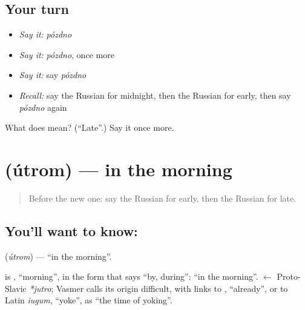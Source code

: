 \subsection*{Your turn}
\begin{itemize}
\raggedright
  \item \emph{Say it:} \emph{pózdno}
  \item \emph{Say it:} \emph{pózdno}, once more
  \item \emph{Say it:} say \emph{pózdno}
  \item \emph{Recall:} say the Russian for midnight, then the Russian for early, then say \emph{pózdno} again
\end{itemize}

\begin{tcolorbox}[breakable,colback=teal!4,colframe=teal!35!black,title={Before you move on}]
What does  mean? (\textquotedblleft{}Late\textquotedblright{}.) Say it once more.
\end{tcolorbox}
\section[\texorpdfstring{\ru{утром} (útrom)}{утром (útrom)}]{ (útrom) — in the morning}

\label{lesson:RU-C83-in-the-morning}



\begin{quote}
Before the new one: say the Russian for early, then the Russian for late.
\end{quote}

\subsection*{You'll want to know: }
\textbf{} (\emph{útrom}) — \textquotedblleft{}in the morning\textquotedblright{}.

\begin{cousinweb}
\textbf{} is \emph{}, \textquotedblleft{}morning\textquotedblright{}, in the form that says \textquotedblleft{}by, during\textquotedblright{}: \textquotedblleft{}in the morning\textquotedblright{}. \emph{} $\leftarrow$ Proto-Slavic \emph{*jutro}; Vasmer calls its origin difficult, with links to \emph{}, \textquotedblleft{}already\textquotedblright{}, or to Latin \emph{iugum}, \textquotedblleft{}yoke\textquotedblright{}, as \textquotedblleft{}the time of yoking\textquotedblright{}.
\end{cousinweb}

